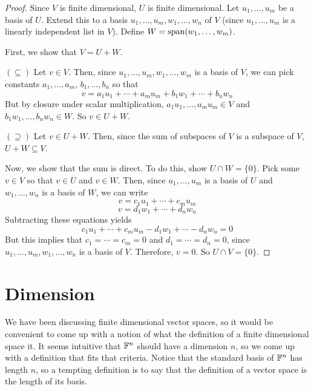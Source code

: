\begin{proof}
    Since $V$ is finite dimensional, $U$ is finite dimensional. Let $u_1, \dots, u_m$ be a basis of $U$. Extend this to a basis $u_1, \dots, u_m, w_1, \dots, w_n$ of $V$ (since $u_1,\dots, u_m$ is a linearly independent list in $V$). Define $W = \operatorname{span}(w_1, \dots, w_m)$. 

    First, we show that $V = U+W$. 
    
    $(\subseteq)$ Let $v\in V$. Then, since $u_1, \dots, u_m, w_1, \dots, w_m$ is a basis of $V$, we can pick constants $a_1, \dots, a_m$, $b_1, \dots, b_n$ so that
    \[ v = a_1u_1 + \cdots + a_mu_m + b_1w_1 + \cdots + b_nw_n \]
    But by closure under scalar multiplication, $a_1u_1, \dots, a_mu_m \in V$ and $b_1w_1, \dots, b_nw_n\in W$. So $v\in U+W$.

    $(\supseteq)$ Let $v\in U+W$. Then, since the sum of subspaces of $V$ is a subspace of $V$, $U+W\subseteq V$.

    Now, we show that the sum is direct. To do this, show $U\cap W = \{0\}$. Pick some $v\in V$ so that $v\in U$ and $v\in W$. Then, since $u_1, \dots, u_m$ is a basis of $U$ and $w_1, \dots, w_n$ is a basis of $W$, we can write
    \[ v = c_1u_1 + \cdots + c_mu_m\]
    \[ v = d_1w_1 + \cdots + d_nw_n\]
    Subtracting these equations yields
    \[ c_1u_1 + \cdots + c_mu_m - d_1w_1 + \cdots - d_nw_n = 0 \]
    But this implies that $c_1 = \cdots = c_m =0$ and $d_1 = \cdots = d_n = 0$, since $u_1, \dots, u_m, w_1, \dots, w_n$ is a basis of $V$. Therefore, $v=0$. So $U\cap V = \{0\}$.
\end{proof}
\section{Dimension}
We have been discussing finite dimensional vector spaces, so it would be convenient to come up with a notion of what the definition of a finite dimensional space it. It seems intuitive that $\mathbb F^n$ should have a dimension $n$, so we come up with a definition that fits that criteria. Notice that the standard basis of $\mathbb F^n$ has length $n$, so a tempting definition is to say that the definition of a vector space is the length of its basis.

